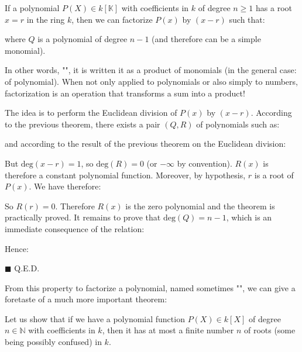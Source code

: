 	\begin{theorem}
	If a polynomial $P(X)\in k[\mathbb{K}]$ with coefficients in $k$ of degree $n\geq 1$ has a root $x=r$ in the ring $k$, then we can factorize $P(x)$ by $(x - r)$ such that:
	
	where $Q$ is a polynomial of degree $n-1$ (and therefore can be a simple monomial).
	
	In other words, "", it is written it as a product of monomials (in the general case: of polynomial). When not only applied to polynomials or also simply to numbers, factorization is an operation that transforms a sum into a product!
	\end{theorem}
	\begin{dem}
	The idea is to perform the Euclidean division of $P(x)$ by $(x-r)$. According to the previous theorem, there exists a pair $(Q, R)$ of polynomials such as:
	
and according to the result of the previous theorem on the Euclidean division:
	
	But $\text{deg}(x-r)=1$, so $\text{deg}(R)=0$ (or $-\infty$ by convention). $R(x)$ is therefore a constant polynomial function. Moreover, by hypothesis, $r$ is a root of $P(x)$. We have therefore:
	
	So $R(r)=0$. Therefore $R(x)$ is the zero polynomial and the theorem is practically proved. It remains to prove that $\text{deg}(Q)=n-1$, which is an immediate consequence of the relation:
	
	Hence:
	
	\begin{flushright}
		$\blacksquare$  Q.E.D.
	\end{flushright}
	\end{dem}
	From this property to factorize a polynomial, named sometimes "", we can give a foretaste of a much more important theorem:
	\begin{theorem}
	Let us show that if we have a polynomial  function $P(X)\in k[X]$ of degree $n\in \mathbb{N}$ with coefficients in $k$, then it has at most a finite number $n$ of roots (some being possibly confused) in $k$.
	\end{theorem}

